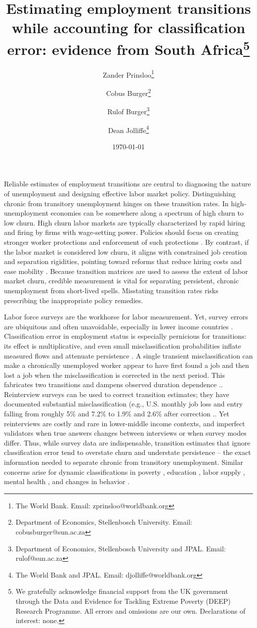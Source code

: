 \documentclass[letterpaper,12pt,final,dvipsnames]{article}
\title{Estimating employment transitions while accounting for classification error: evidence from South Africa\thanks{We gratefully acknowledge financial support from the UK government through the Data and Evidence for Tackling Extreme Poverty (DEEP) Research Programme. All errors and omissions are our own. Declarations of interest: none.}}
\author{Zander Prinsloo\thanks{The World Bank. Email: zprinsloo@worldbank.org } \and Cobus Burger\thanks{Department of Economics, Stellenbosch University. Email: cobusburger@sun.ac.za}  \and Rulof Burger\thanks{Department of Economics, Stellenbosch University and JPAL. Email: rulof@sun.ac.za} \and Dean Jolliffe\thanks{The World Bank and JPAL. Email: djolliffe@worldbank.org}}
\date{\today}
\begin{document}
\maketitle

Reliable estimates of employment transitions are central to diagnosing the nature of unemployment and designing effective labor market policy. Distinguishing chronic from transitory unemployment hinges on these transition rates. In high‐unemployment economies can be somewhere along a spectrum of high churn to low churn. High churn labor markets are typically characterized by rapid hiring and firing by firms with wage‐setting power. Policies should focus on creating stronger worker protections and enforcement of such protections \citep{aghion2006}. By contrast, if the labor market is considered low churn, it aligns with constrained job creation and separation rigidities, pointing toward reforms that reduce hiring costs and ease mobility \citep{nattrass2000}. Because transition matrices are used to assess the extent of labor market churn, credible measurement is vital for separating persistent, chronic unemployment from short-lived spells. Misstating transition rates risks prescribing the inappropriate policy remedies.  

Labor force surveys are the workhorse for labor measurement. Yet, survey errors are ubiquitous and often unavoidable, especially in lower income countries \citep{ashenfelter1986}. Classification error in employment status is especially pernicious for transitions: its effect is multiplicative, and even small misclassification probabilities inflate measured flows and attenuate persistence \citep{porteba1986}. A single transient misclassification can make a chronically unemployed worker appear to have first found a job and then lost a job when the misclassification is corrected in the next period. This fabricates two transitions and dampens observed duration dependence \citep{meyer1988}.. Reinterview surveys can be used to correct transition estimates; they have documented substantial misclassification (e.g., U.S. monthly job loss and entry falling from roughly 5\% and 7.2\% to 1.9\% and 2.6\% after correction \citep{porteba1986}.. Yet reinterviews are costly and rare in lower-middle income contexts, and imperfect validators when true answers changes between interviews or when survey modes differ. Thus, while survey data are indispensable, transition estimates that ignore classification error tend to overstate churn and understate persistence – the exact information needed to separate chronic from transitory unemployment. Similar concerns arise for dynamic classifications in poverty \citep{Bigsten2008}, education \citep{fredriksson1997economic}, labor supply \citep{cairo2022cyclicality}, mental health \citep{van2017critique}, and changes in behavior \citep{khosravi2018transition}. 
\end{document}
